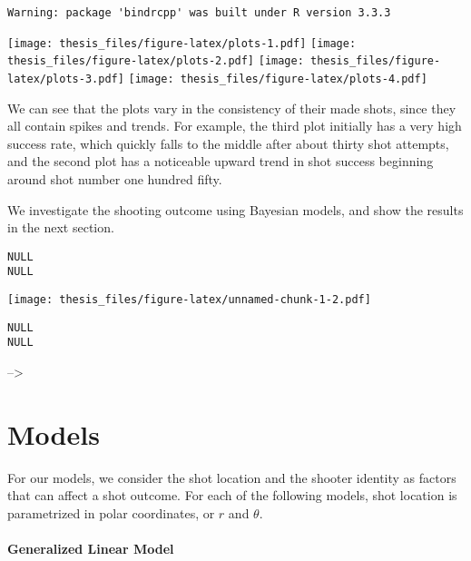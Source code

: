 \documentclass[12pt,twoside]{dukestatscithesis}
\theoremstyle{definition}
\theoremstyle{definition}
\theoremstyle{definition}
\theoremstyle{remark}
\begin{document}
\begin{verbatim}
Warning: package 'bindrcpp' was built under R version 3.3.3
\end{verbatim}
\begin{Shaded}
\begin{Highlighting}[]
\NormalTok{:}
  \StringTok{ }
  \NormalTok{(r[[}\NormalTok{]],r[[}\NormalTok{]])}
\NormalTok{\}}
\end{Highlighting}
\end{Shaded}
\texttt{[image: thesis\_files/figure-latex/plots-1.pdf]}
\texttt{[image: thesis\_files/figure-latex/plots-2.pdf]}
\texttt{[image: thesis\_files/figure-latex/plots-3.pdf]}
\texttt{[image: thesis\_files/figure-latex/plots-4.pdf]}

We can see that the plots vary in the consistency of their made shots,
since they all contain spikes and trends. For example, the third plot
initially has a very high success rate, which quickly falls to the
middle after about thirty shot attempts, and the second plot has a
noticeable upward trend in shot success beginning around shot number one
hundred fifty.

We investigate the shooting outcome using Bayesian models, and show the
results in the next section.
\begin{verbatim}
NULL
NULL
\end{verbatim}
\texttt{[image: thesis\_files/figure-latex/unnamed-chunk-1-2.pdf]}
\begin{verbatim}
NULL
NULL
\end{verbatim}
--\textgreater{}

\chapter{Models}\label{model}

For our models, we consider the shot location and the shooter identity
as factors that can affect a shot outcome. For each of the following
models, shot location is parametrized in polar coordinates, or \(r\) and
\(\theta\).

\subsubsection{Generalized Linear Model}\label{generalized-linear-model}
\end{document}
